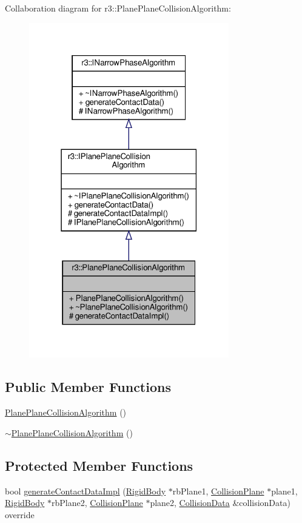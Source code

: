 Collaboration diagram for r3\+:\+:Plane\+Plane\+Collision\+Algorithm\+:\nopagebreak
\begin{figure}[H]
\begin{center}
\leavevmode
\includegraphics[width=247pt]{classr3_1_1_plane_plane_collision_algorithm__coll__graph}
\end{center}
\end{figure}
\subsection*{Public Member Functions}
\begin{DoxyCompactItemize}
\item 
\mbox{\hyperlink{classr3_1_1_plane_plane_collision_algorithm_a9393dcf1554224f91daac5c7b4cd0377}{Plane\+Plane\+Collision\+Algorithm}} ()
\item 
\mbox{\hyperlink{classr3_1_1_plane_plane_collision_algorithm_a804515f9e3f5cc9c3ade9a368c78036f}{$\sim$\+Plane\+Plane\+Collision\+Algorithm}} ()
\end{DoxyCompactItemize}
\subsection*{Protected Member Functions}
\begin{DoxyCompactItemize}
\item 
bool \mbox{\hyperlink{classr3_1_1_plane_plane_collision_algorithm_a33400ba57a8c0550ada0778bb92eeb69}{generate\+Contact\+Data\+Impl}} (\mbox{\hyperlink{classr3_1_1_rigid_body}{Rigid\+Body}} $\ast$rb\+Plane1, \mbox{\hyperlink{classr3_1_1_collision_plane}{Collision\+Plane}} $\ast$plane1, \mbox{\hyperlink{classr3_1_1_rigid_body}{Rigid\+Body}} $\ast$rb\+Plane2, \mbox{\hyperlink{classr3_1_1_collision_plane}{Collision\+Plane}} $\ast$plane2, \mbox{\hyperlink{classr3_1_1_collision_data}{Collision\+Data}} \&collision\+Data) override
\end{DoxyCompactItemize}


